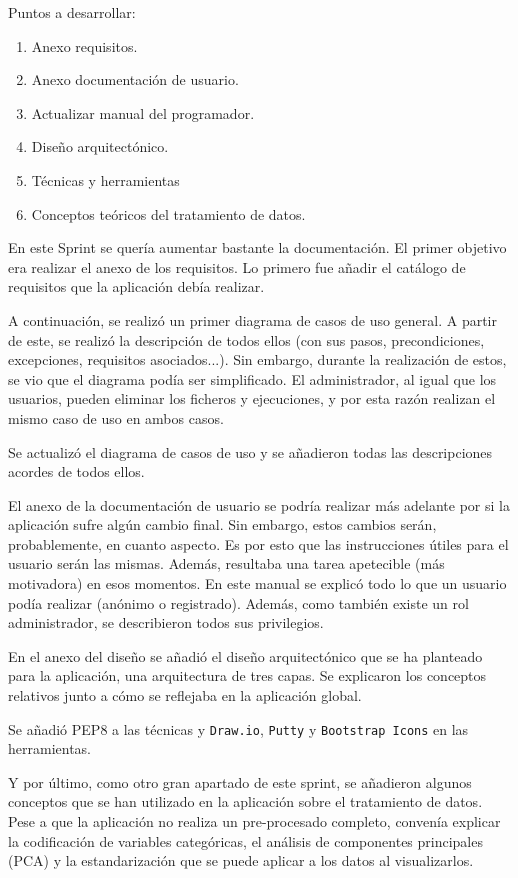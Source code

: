 Puntos a desarrollar:
\begin{enumerate}
    \item Anexo requisitos.
    \item Anexo documentación de usuario.
    \item Actualizar manual del programador.
    \item Diseño arquitectónico.
    \item Técnicas y herramientas
    \item Conceptos teóricos del tratamiento de datos.
\end{enumerate}

En este Sprint se quería aumentar bastante la documentación. El primer objetivo
era realizar el anexo de los requisitos. Lo primero fue añadir el catálogo de
requisitos que la aplicación debía realizar.

A continuación, se realizó un primer diagrama de casos de uso general. A partir
de este, se realizó la descripción de todos ellos (con sus pasos,
precondiciones, excepciones, requisitos asociados...). Sin embargo, durante la
realización de estos, se vio que el diagrama podía ser simplificado. El
administrador, al igual que los usuarios, pueden eliminar los ficheros y
ejecuciones, y por esta razón realizan el mismo caso de uso en ambos casos. 

Se actualizó el diagrama de casos de uso y se añadieron todas las descripciones
acordes de todos ellos.

El anexo de la documentación de usuario se podría realizar más adelante por si
la aplicación sufre algún cambio final. Sin embargo, estos cambios serán,
probablemente, en cuanto aspecto. Es por esto que las instrucciones útiles para
el usuario serán las mismas. Además, resultaba una tarea apetecible (más
motivadora) en esos momentos. En este manual se explicó todo lo que un usuario
podía realizar (anónimo o registrado). Además, como también existe un rol
administrador, se describieron todos sus privilegios.

En el anexo del diseño se añadió el diseño arquitectónico que se ha planteado
para la aplicación, una arquitectura de tres capas. Se explicaron los conceptos
relativos junto a cómo se reflejaba en la aplicación global.

Se añadió PEP8 a las técnicas y \texttt{Draw.io}, \texttt{Putty} y
\texttt{Bootstrap Icons} en las herramientas.

Y por último, como otro gran apartado de este sprint, se añadieron algunos
conceptos que se han utilizado en la aplicación sobre el tratamiento de datos.
Pese a que la aplicación no realiza un pre-procesado completo, convenía explicar
la codificación de variables categóricas, el análisis de componentes principales
(PCA) y la estandarización que se puede aplicar a los datos al visualizarlos.

